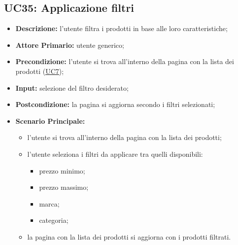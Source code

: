 \subsection{UC35: Applicazione filtri}
\label{sec:UC35}
\begin{itemize}
    \item \textbf{Descrizione:} l'utente filtra i prodotti in base alle loro caratteristiche;
    \item \textbf{Attore Primario:} utente generico;
    \item \textbf{Precondizione:} l'utente si trova all'interno della pagina con la lista dei prodotti (\hyperref[sec:UC7]{\underline{UC7}});
    \item \textbf{Input:} selezione del filtro desiderato;
    \item \textbf{Postcondizione:} la pagina si aggiorna secondo i filtri selezionati;
    \item \textbf{Scenario Principale:}
          \begin{itemize}
              \item l'utente si trova all'interno della pagina con la lista dei prodotti;
              \item l'utente seleziona i filtri da applicare tra quelli disponibili:
              \begin{itemize}
                  \item prezzo minimo;
                  \item prezzo massimo;
                  \item marca;
                  \item categoria;
              \end{itemize}
              \item la pagina con la lista dei prodotti si aggiorna con i prodotti filtrati.
          \end{itemize}
\end{itemize}